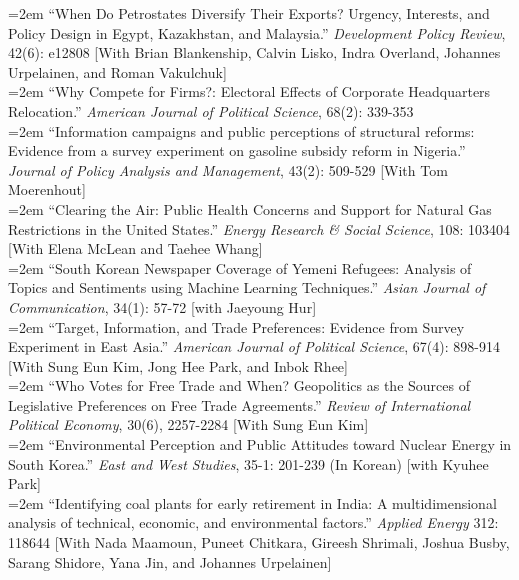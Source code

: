 \hangindent=2em 
 ``When Do Petrostates Diversify Their Exports? Urgency, Interests, and Policy Design in Egypt, Kazakhstan, and Malaysia.'' \textit{Development Policy Review}, 42(6): e12808 [With Brian Blankenship, Calvin Lisko, Indra Overland, Johannes Urpelainen, and Roman Vakulchuk]\\

\hangindent=2em 
 ``Why Compete for Firms?: Electoral Effects of Corporate Headquarters Relocation.'' \textit{American Journal of Political Science},  68(2): 339-353\\

\hangindent=2em 
 ``Information campaigns and public perceptions of structural reforms: Evidence from a survey experiment on gasoline subsidy reform in Nigeria.'' \textit{Journal of Policy Analysis and Management}, 43(2): 509-529 [With Tom Moerenhout]  \\

\hangindent=2em 
 ``Clearing the Air: Public Health Concerns and Support for Natural Gas Restrictions in the United States.'' \textit{Energy Research \& Social Science}, 108: 103404 [With Elena McLean and Taehee Whang]\\

\hangindent=2em
 ``South Korean Newspaper Coverage of Yemeni Refugees: Analysis of Topics and Sentiments using Machine Learning Techniques.'' \textit{Asian Journal of Communication}, 34(1): 57-72 [with Jaeyoung Hur] \\

\hangindent=2em 
 ``Target, Information, and Trade Preferences: Evidence from Survey Experiment in East Asia.'' \textit{American Journal of Political Science}, 67(4): 898-914 [With Sung Eun Kim, Jong Hee Park, and Inbok Rhee]\\

\hangindent=2em 
 ``Who Votes for Free Trade and When? Geopolitics as the Sources of Legislative Preferences on Free Trade Agreements.'' \textit{Review of International Political Economy}, 30(6), 2257-2284 [With Sung Eun Kim]\\

\hangindent=2em
 ``Environmental Perception and Public Attitudes toward Nuclear Energy in South Korea.'' \textit{East and West Studies}, 35-1: 201-239 (In Korean) [with Kyuhee Park]\\


\hangindent=2em 
 ``Identifying coal plants for early retirement in India: A multidimensional analysis of technical, economic, and environmental factors.'' \textit{Applied Energy} 312: 118644 [With Nada Maamoun, Puneet Chitkara, Gireesh Shrimali, Joshua Busby, Sarang Shidore, Yana Jin, and Johannes Urpelainen]\\

